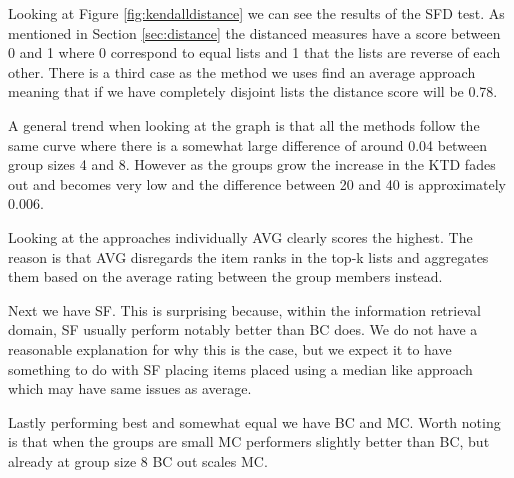 Looking at Figure \ref{fig:kendalldistance} we can see the results of the SFD test. As mentioned in Section \ref{sec:distance} the distanced measures have a score between 0 and 1 where 0 correspond to equal lists and 1 that the lists are reverse of each other. There is a third case as the method we uses find an average approach meaning that if we have completely disjoint lists the distance score will be 0.78.

A general trend when looking at the graph is that all the methods follow the same curve where there is a somewhat large difference of around 0.04 between group sizes 4 and 8. However as the groups grow the increase in the KTD fades out and becomes very low and the difference between 20 and 40 is approximately 0.006. 

Looking at the approaches individually AVG clearly scores the highest. The reason is that AVG disregards the item ranks in the top-k lists and aggregates them based on the average rating between the group members instead.  
   
Next we have SF. This is surprising because, within the information retrieval domain, SF usually perform notably better than BC does.  We do not have a reasonable explanation for why this is the case, but we expect it to have something to do with SF placing items placed using a median like approach which may have same issues as average.

Lastly performing best and somewhat equal we have BC and MC. Worth noting is that when the groups are small MC performers slightly better than BC, but already at group size 8 BC out scales MC.

